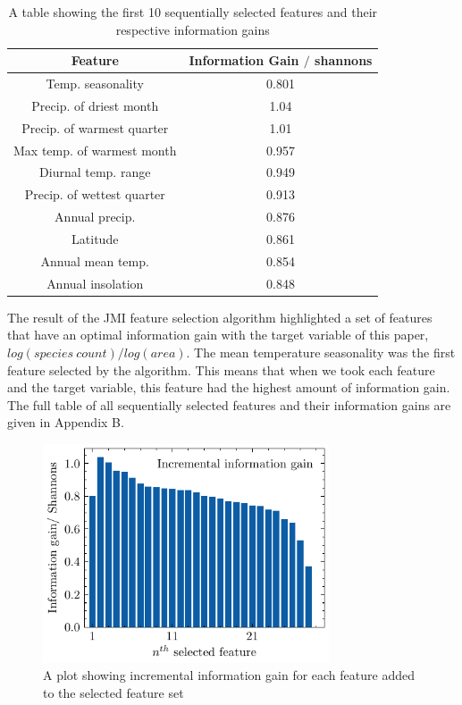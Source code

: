 \documentclass[prl,showpacs,superscriptaddress,twocolumn,longbibliography]{revtex4-1}
\begin{document}
\begin{table}[h]
\begin{center}
\begin{tabular}{| c |  c |}
\hline
Feature & Information Gain $/$ shannons \\
\hline
Temp. seasonality & 0.801\\ 
Precip. of driest month & 1.04\\
Precip. of warmest quarter &  1.01\\
Max temp. of warmest month &  0.957\\
Diurnal temp. range & 0.949\\
Precip. of wettest quarter & 0.913\\
Annual precip. & 0.876\\
Latitude & 0.861\\
Annual mean temp. & 0.854\\
Annual insolation & 0.848\\
\hline

\end{tabular}
\end{center}
\caption{A table showing the first 10 sequentially selected features and their respective information gains }
\end{table}

The result of the JMI feature selection algorithm highlighted a set of features that have an optimal information gain with the target variable of this paper, $log(species \: count)/log(area)$. The mean temperature seasonality was the first feature selected by the algorithm. This means that when we took each feature and the target variable, this feature had the highest amount of information gain. The full table of all sequentially selected features and their information gains are given in Appendix B.

\begin{figure}
	\caption{A plot showing incremental information gain for each feature added to the selected feature set}
	\centering
\includegraphics[width=240pt]{Features.pdf}
\end{figure}
\end{document}
